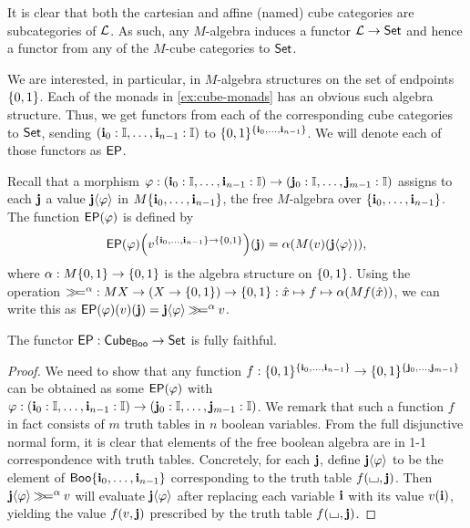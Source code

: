 \documentclass[a4paper]{article}
\begin{document}
It is clear that both the cartesian and affine (named) cube categories are subcategories of ${\mathcal L}$.
As such, any $M$-algebra induces a functor ${\mathcal L} \to {\mathsf{Set}}$ and hence a functor from any of the $M$-cube categories to ${\mathsf{Set}}$.

We are interested, in particular, in $M$-algebra structures on the set of endpoints $\mathopen{}\left\{ 0, 1 \right\}\mathclose{}$.
Each of the monads in \cref{ex:cube-monads} has an obvious such algebra structure.
Thus, we get functors from each of the corresponding cube categories to ${\mathsf{Set}}$,
sending $(\mathbf{i}_0 : {\mathbb I}, \ldots, \mathbf{i}_{n-1} : {\mathbb I})$ to $\mathopen{}\left\{ 0, 1 \right\}\mathclose{}^{\mathopen{}\left\{ \mathbf{i}_0, \ldots, \mathbf{i}_{n-1} \right\}\mathclose{}}$.
We will denote each of those functors as $\mathsf{EP}$.

Recall that a morphism $\varphi : (\mathbf{i}_0 : {\mathbb I}, \ldots, \mathbf{i}_{n-1} : {\mathbb I}) \to (\mathbf{j}_0 : {\mathbb I}, \ldots, \mathbf{j}_{m-1} : {\mathbb I})$ assigns to each $\mathbf{j}$ a value $\mathbf{j}\langle \varphi \rangle$ in $M \mathopen{}\left\{ \mathbf{i}_0, \ldots, \mathbf{i}_{n-1} \right\}\mathclose{}$, the free $M$-algebra over $\mathopen{}\left\{ \mathbf{i}_0, \ldots, \mathbf{i}_{n-1} \right\}\mathclose{}$.
The function $\mathsf{EP}(\varphi)$ is defined by
\[
	\mathsf{EP}(\varphi)
	\mathopen{}\left(  v^{\mathopen{}\left\{ \mathbf{i}_0, \ldots, \mathbf{i}_{n-1} \right\}\mathclose{} \to \mathopen{}\left\{ 0, 1 \right\}\mathclose{}}  \right)\mathclose{}
	(\mathbf{j})
	= \alpha\mathopen{}\left(  M(v)(\mathbf{j} \langle \varphi \rangle)  \right)\mathclose{},
\]
where $\alpha : M\mathopen{}\left\{ 0, 1 \right\}\mathclose{} \to \mathopen{}\left\{ 0, 1 \right\}\mathclose{}$ is the algebra structure on $\mathopen{}\left\{ 0, 1 \right\}\mathclose{}$.
Using the operation $\mathbin{\gg\hspace{-.5ex}=}^\alpha : MX \to (X \to \mathopen{}\left\{ 0, 1 \right\}\mathclose{}) \to \mathopen{}\left\{ 0, 1 \right\}\mathclose{} : \hat x \mapsto f \mapsto \alpha (Mf(\hat x))$, we can write this as $\mathsf{EP}(\varphi)(v)(\mathbf{j}) = \mathbf{j} \langle \varphi \rangle \mathbin{\gg\hspace{-.5ex}=}^\alpha v$.

\begin{proposition}
	The functor $\mathsf{EP} : {\mathsf{Cube}}_{\mathsf{Boo}} \to {\mathsf{Set}}$ is fully faithful.
\end{proposition}
\begin{proof}
	We need to show that any function $f : \mathopen{}\left\{ 0, 1 \right\}\mathclose{}^{\mathopen{}\left\{ \mathbf{i}_0, \ldots, \mathbf{i}_{n-1} \right\}\mathclose{}} \to \mathopen{}\left\{ 0, 1 \right\}\mathclose{}^{\mathopen{}\left\{ \mathbf{j}_0, \ldots, \mathbf{j}_{m-1} \right\}\mathclose{}}$
	can be obtained as some $\mathsf{EP}(\varphi)$ with $\varphi : (\mathbf{i}_0 : {\mathbb I}, \ldots, \mathbf{i}_{n-1} : {\mathbb I}) \to (\mathbf{j}_0 : {\mathbb I}, \ldots, \mathbf{j}_{m-1} : {\mathbb I})$.
	We remark that such a function $f$ in fact consists of $m$ truth tables in $n$ boolean variables.
	From the full disjunctive normal form, it is clear that elements of the free boolean algebra are in 1-1 correspondence with truth tables.
	Concretely, for each $\mathbf{j}$, define $\mathbf{j} \langle \varphi \rangle$ to be the element of $\mathsf{Boo} \mathopen{}\left\{ \mathbf{i}_0, \ldots, \mathbf{i}_{n-1} \right\}\mathclose{}$ corresponding to the truth table $f({\llcorner\hspace{-.4ex}\lrcorner}, \mathbf{j})$.
	Then $\mathbf{j} \langle \varphi \rangle \mathbin{\gg\hspace{-.5ex}=}^\alpha v$ will evaluate $\mathbf{j} \langle \varphi \rangle$ after replacing each variable $\mathbf{i}$ with its value $v(\mathbf{i})$, yielding the value $f(v, \mathbf{j})$ prescribed by the truth table $f({\llcorner\hspace{-.4ex}\lrcorner}, \mathbf{j})$.
\end{proof}
\end{document}
